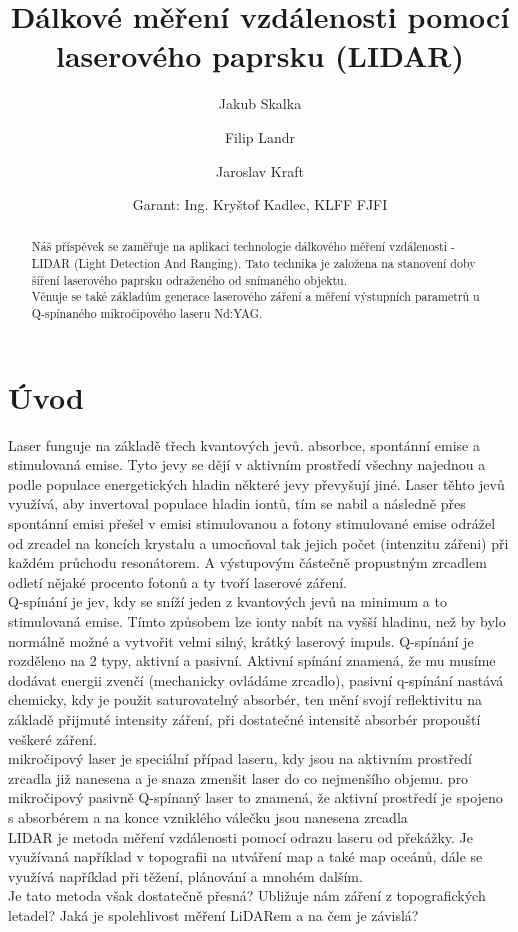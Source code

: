 \documentclass[12pt,a4paper]{article}
\title{Dálkové měření vzdálenosti pomocí laserového paprsku (LIDAR)}
\author[1]{Jakub Skalka}
\author[2]{Filip Landr}
\author[3]{Jaroslav Kraft}
\date{\small Garant: Ing. Kryštof Kadlec, KLFF FJFI\vspace{-2em}} %
\affil[1]{Gymnázium, České Budějovice, Jírovcova 8; skalkaj@jirovcovka.net}
\affil[2]{Gymnázium, Praha 5, Nad Kavalírkou 100/1; fi.landr@seznam.cz}
\affil[3]{Gymnázium, Příbram, Legionářů 402; kraft.jarda@gmail.com\vspace{-1em}} %
\begin{document}
\maketitle \thispagestyle{empty}

\begin{abstract} \noindent
    Náš příspěvek se zaměřuje na aplikaci technologie dálkového měření vzdálenosti - LIDAR (Light Detection And Ranging). Tato technika je založena na stanovení doby šíření laserového paprsku odraženého od snímaného objektu. \\Věnuje se také základům generace laserového záření a měření výstupních parametrů u Q-spínaného mikročipového laseru Nd:YAG.\end{abstract}


\section{Úvod}
Laser funguje na základě třech kvantových jevů. absorbce, spontánní emise a stimulovaná emise. Tyto jevy se dějí v aktivním prostředí všechny najednou a podle populace energetických hladin některé jevy převyšují jiné. Laser těhto jevů využívá, aby invertoval populace hladin iontů, tím se nabil a následně přes spontánní emisi přešel v emisi stimulovanou a fotony stimulované emise odrážel od zrcadel na koncích krystalu a umocňoval tak jejich počet (intenzitu zářeni) při každém průchodu resonátorem. A výstupovým částečně propustným zrcadlem odletí nějaké procento fotonů a ty tvoří laserové záření.
\\Q-spínání je jev, kdy se sníží jeden z kvantových jevů na minimum a to stimulovaná emise. Tímto způsobem lze ionty nabít na vyšší hladinu, než by bylo normálně možné a vytvořit velmi silný, krátký laserový impuls. Q-spínání je rozděleno na 2 typy, aktivní a pasivní. Aktivní spínání znamená, že mu musíme dodávat energii zvenčí (mechanicky ovládáme zrcadlo), pasivní q-spínání nastává chemicky, kdy je použit saturovatelný absorbér, ten mění svojí reflektivitu na základě přijmuté intensity záření, při dostatečné intensitě absorbér propouští veškeré záření.
\\mikročipový laser je speciální případ laseru, kdy jsou na aktivním prostředí zrcadla již nanesena a je snaza zmenšit laser do co nejmenšího objemu. pro mikročipový pasivně Q-spínaný laser to znamená, že aktivní prostředí je spojeno s absorbérem a na konce vzniklého válečku jsou nanesena zrcadla
\\LIDAR je metoda měření vzdálenosti pomocí odrazu laseru od překážky. Je využívaná například v topografii na utváření map a také map oceánů, dále se využívá například při těžení, plánování a mnohém dalším.
\\Je tato metoda však dostatečně přesná? Ubližuje nám záření z topografických letadel? Jaká je spolehlivost měření LiDARem a na čem je závislá?
\end{document}
